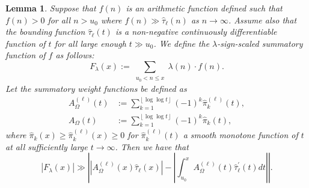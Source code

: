 \documentclass[11pt,reqno,a4letter]{article}
\numberwithin{figure}{section}
\numberwithin{table}{section}
\newcommand{\floor}[1]{\left\lfloor #1 \right\rfloor}
\theoremstyle{plain}
\newtheorem{lemma}[theorem]{Lemma}
\numberwithin{theorem}{section}
\theoremstyle{definition}
\newcommand{\SuccSim}[0]{\overset{_{\scriptsize{\blacktriangle}}}{\succsim}}
\renewcommand{\SuccSim}[0]{\ensuremath{\gg}}
\begin{document}
\begin{lemma} 
\label{lemma_CLT_and_AbelSummation} 
Suppose that $f(n)$ is an arithmetic function defined 
such that $f(n) > 0$ for all $n > u_0$ where 
$f(n) \SuccSim \widehat{\tau}_{\ell}(n)$ as $n \rightarrow \infty$. Assume also that 
the bounding function $\widehat{\tau}_{\ell}(t)$ is a non-negative 
continuously differentiable function of $t$ for all 
large enough $t \gg u_0$.  
We define the $\lambda$-sign-scaled summatory function of $f$ as follows: 
\[
F_{\lambda}(x) := \sum_{\substack{u_0 < n \leq x}} \lambda(n) \cdot f(n). 
\]
Let the summatory weight functions be defined as 
\begin{align*} 
A_{\Omega}^{(\ell)}(t) & := \sum_{k=1}^{\floor{\log\log t}} (-1)^k \widehat{\pi}_k^{(\ell)}(t), \\ 
A_{\Omega}(t) & := \sum_{k=1}^{\floor{\log\log t}} (-1)^k \widehat{\pi}_k(t), 
\end{align*} 
where $\widehat{\pi}_k(x) \geq \widehat{\pi}_k^{(\ell)}(x) \geq 0$ for 
$\widehat{\pi}_k^{(\ell)}(t)$ a smooth monotone 
function of $t$ at all sufficiently large $t \rightarrow \infty$. 
Then we have that 
\begin{equation} 
\label{eqn_Flambdax_RHA_AbelSummationFormula_v1} 
|F_{\lambda}(x)| \SuccSim \left\lvert 
     \left\lvert A_{\Omega}^{(\ell)}(x) \widehat{\tau}_{\ell}(x) \right\rvert - 
     \left\lvert \int_{u_0}^{x} A_{\Omega}^{(\ell)}(t) \widehat{\tau}_{\ell}^{\prime}(t) dt 
     \right\rvert \right\rvert.  
\end{equation} 
\end{lemma}
\end{document}
